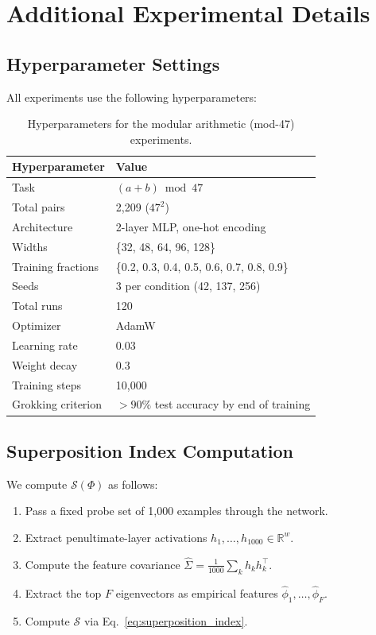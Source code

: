 \documentclass{article}
\newcommand{\reals}{\mathbb{R}}
\newcommand{\feat}{\phi}
\newcommand{\supidx}{\mathcal{S}}
\newcommand{\Fnum}{F}
\begin{document}
\section{Additional Experimental Details}
\label{app:experiments}

\subsection{Hyperparameter Settings}

All experiments use the following hyperparameters:

\begin{table}[h]
\centering
\caption{Hyperparameters for the modular arithmetic (mod-47) experiments.}
\vspace{0.5em}
\begin{tabular}{@{}ll@{}}
\toprule
\textbf{Hyperparameter} & \textbf{Value} \\
\midrule
Task & $(a+b) \bmod 47$ \\
Total pairs & 2{,}209 ($47^2$) \\
Architecture & 2-layer MLP, one-hot encoding \\
Widths & \{32, 48, 64, 96, 128\} \\
Training fractions & \{0.2, 0.3, 0.4, 0.5, 0.6, 0.7, 0.8, 0.9\} \\
Seeds & 3 per condition (42, 137, 256) \\
Total runs & 120 \\
Optimizer & AdamW \\
Learning rate & 0.03 \\
Weight decay & 0.3 \\
Training steps & 10{,}000 \\
Grokking criterion & $>90\%$ test accuracy by end of training \\
\bottomrule
\end{tabular}
\end{table}

\subsection{Superposition Index Computation}

We compute $\supidx(\Phi)$ as follows:
\begin{enumerate}
    \item Pass a fixed probe set of 1{,}000 examples through the network.
    \item Extract penultimate-layer activations $h_1, \ldots, h_{1000} \in \reals^w$.
    \item Compute the feature covariance $\hat{\Sigma} = \frac{1}{1000} \sum_k h_k h_k^\top$.
    \item Extract the top $\Fnum$ eigenvectors as empirical features $\hat{\feat}_1, \ldots, \hat{\feat}_\Fnum$.
    \item Compute $\supidx$ via Eq.~\eqref{eq:superposition_index}.
\end{enumerate}
\end{document}
